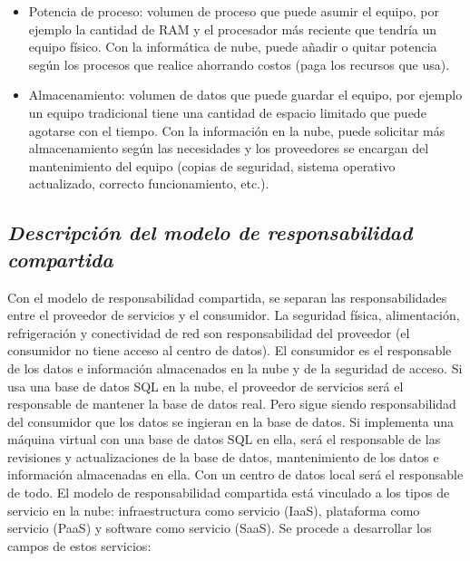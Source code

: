 \documentclass[runningheads]{llncs}
\providecommand{\tightlist}{%
  \setlength{\itemsep}{0pt}\setlength{\parskip}{0pt}}
\begin{document}
\begin{itemize}
\tightlist
\item
  Potencia de proceso: volumen de proceso que puede asumir el equipo,
  por ejemplo la cantidad de RAM y el procesador más reciente que
  tendría un equipo físico. Con la informática de nube, puede añadir o
  quitar potencia según los procesos que realice ahorrando costos (paga
  los recursos que usa).
\item
  Almacenamiento: volumen de datos que puede guardar el equipo, por
  ejemplo un equipo tradicional tiene una cantidad de espacio limitado
  que puede agotarse con el tiempo. Con la información en la nube, puede
  solicitar más almacenamiento según las necesidades y los proveedores
  se encargan del mantenimiento del equipo (copias de seguridad, sistema
  operativo actualizado, correcto funcionamiento, etc.).
\end{itemize}

\hypertarget{descripciuxf3n-del-modelo-de-responsabilidad-compartida}{%
\subsection{\texorpdfstring{\emph{Descripción del modelo de
responsabilidad
compartida}}{Descripción del modelo de responsabilidad compartida}}\label{descripciuxf3n-del-modelo-de-responsabilidad-compartida}}

Con el modelo de responsabilidad compartida, se separan las
responsabilidades entre el proveedor de servicios y el consumidor. La
seguridad física, alimentación, refrigeración y conectividad de red son
responsabilidad del proveedor (el consumidor no tiene acceso al centro
de datos). El consumidor es el responsable de los datos e información
almacenados en la nube y de la seguridad de acceso. Si usa una base de
datos SQL en la nube, el proveedor de servicios será el responsable de
mantener la base de datos real. Pero sigue siendo responsabilidad del
consumidor que los datos se ingieran en la base de datos. Si implementa
una máquina virtual con una base de datos SQL en ella, será el
responsable de las revisiones y actualizaciones de la base de datos,
mantenimiento de los datos e información almacenadas en ella. Con un
centro de datos local será el responsable de todo. El modelo de
responsabilidad compartida está vinculado a los tipos de servicio en la
nube: infraestructura como servicio (IaaS), plataforma como servicio
(PaaS) y software como servicio (SaaS). Se procede a desarrollar los
campos de estos servicios:
\end{document}

